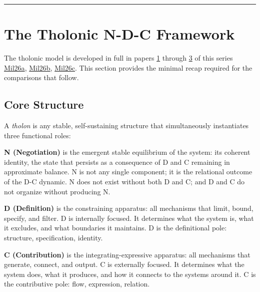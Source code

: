 \documentclass[12pt]{article}
\begin{document}
\begin{center}\rule{0.5\linewidth}{0.5pt}\end{center}

\section{The Tholonic N-D-C Framework}\label{the-tholonic-n-d-c-framework}

The tholonic model is developed in full in papers
\href{https://github.com/baardev/truevalue/blob/main/docnav/Research/papers/1_recursive-tholonic-five-constants/1_recursive-tholonic-five-constants.pdf}{1}
through
\href{https://github.com/baardev/truevalue/blob/main/docnav/Research/papers/3_minimal-recursive-triadic-framework/3_minimal-recursive-triadic-framework.pdf}{3}
of this series
\href{https://github.com/baardev/truevalue/blob/main/docnav/Research/papers/1_recursive-tholonic-five-constants/1_recursive-tholonic-five-constants.pdf}{Mil26a},
\href{https://github.com/baardev/truevalue/blob/main/docnav/Research/papers/3_minimal-recursive-triadic-framework/3_minimal-recursive-triadic-framework.pdf}{Mil26b},
\href{https://github.com/baardev/truevalue/blob/main/docnav/Research/papers/6_qualitative-nature-integers-triadic-roles/6_qualitative-nature-integers-triadic-roles.pdf}{Mil26c}.
This section provides the minimal recap required for the comparisons
that follow.

\subsection{Core Structure}\label{core-structure}

A \emph{tholon} is any stable, self-sustaining structure that
simultaneously instantiates three functional roles:

\textbf{N (Negotiation)} is the emergent stable equilibrium of the
system: its coherent identity, the state that persists as a consequence
of D and C remaining in approximate balance. N is not any single
component; it is the relational outcome of the D-C dynamic. N does not
exist without both D and C; and D and C do not organize without
producing N.

\textbf{D (Definition)} is the constraining apparatus: all mechanisms
that limit, bound, specify, and filter. D is internally focused. It
determines what the system is, what it excludes, and what boundaries it
maintains. D is the definitional pole: structure, specification,
identity.

\textbf{C (Contribution)} is the integrating-expressive apparatus: all
mechanisms that generate, connect, and output. C is externally focused.
It determines what the system does, what it produces, and how it
connects to the systems around it. C is the contributive pole: flow,
expression, relation.
\end{document}
